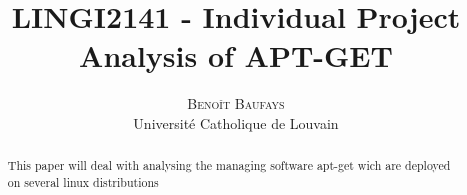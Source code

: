 \documentclass[twoside]{article}
\title{\vspace{-15mm}\fontsize{24pt}{10pt}\selectfont\textbf{LINGI2141 - Individual Project \\Analysis of APT-GET}} %
\author{
\large
\textsc{Benoît Baufays}\\[2mm] %
\normalsize Université Catholique de Louvain \\ %
\vspace{-5mm}
}
\date{}
\begin{document}
\maketitle %

\thispagestyle{fancy} %


\begin{abstract}

This paper will deal with analysing the managing software apt-get wich are deployed on several linux distributions 

\end{abstract}

\end{document}
